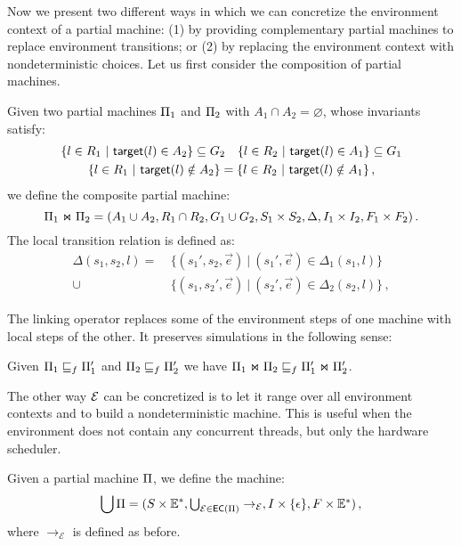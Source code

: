 Now we present two different ways in which
we can concretize the environment context of a partial machine:
(1) by providing complementary partial machines to replace environment transitions;
or (2) by replacing the environment context with nondeterministic choices.
Let us first consider the composition of partial machines.

\begin{definition}
\label{def:link:partial}
Given two partial machines $\Pi_1$ and $\Pi_2$ with
$A_1 \cap A_2 = \varnothing$,
whose invariants satisfy:
\begin{gather*}
\{ l \in R_1 \ |\ \kw{target}(l) \in A_2 \} \subseteq G_2 \quad
\{ l \in R_2 \ |\ \kw{target}(l) \in A_1 \} \subseteq G_1 \\
\{ l \in R_1 \ |\ \kw{target}(l) \notin A_2 \} = \{ l \in R_2 \ |\ \kw{target}(l) \notin A_1 \}\,,
\end{gather*}
we define the composite partial machine:
\[ \Pi_1 \Join \Pi_2 =
	(A_1 \cup A_2,
	 R_1 \cap R_2,
	 G_1 \cup G_2,
	 S_1 \times S_2,
	 \Delta,
	 I_1 \times I_2,
	 F_1 \times F_2) \,. \]
The local transition relation is defined as:
\begin{align*}
\Delta(s_1, s_2, l) =
	&\ \{ (s_1', s_2, \vec{e}) \ |\ (s_1', \vec{e}) \in \Delta_1(s_1, l) \} \\ \cup
	&\ \{ (s_1, s_2', \vec{e}) \ |\ (s_2', \vec{e}) \in \Delta_2(s_2, l) \} \,,
\end{align*}
\end{definition}

The linking operator replaces some of the environment steps of one machine
with local steps of the other.
It preserves simulations in the following sense:

\begin{lemma}
\label{lemma:mono}
Given $\Pi_1 \sqsubseteq_f \Pi_1'$ and $\Pi_2 \sqsubseteq_f \Pi_2'$ we have
$\Pi_1 \Join \Pi_2 \sqsubseteq_f \Pi_1' \Join \Pi_2'$.
\end{lemma}

The other way $\mathcal{E}$ can be concretized
is to let it range over all environment contexts
and to build a nondeterministic machine.
This is useful when the environment
does not contain any concurrent threads,
but only the hardware scheduler.

\begin{definition}
Given a partial machine $\Pi$,
we define the machine:
\[ \bigcup \Pi =
	(S \times \mathbb{E}^*, \textstyle\bigcup\nolimits_{\mathcal{E} \in {{\mathsf{EC}}({\Pi})}} \rightarrow_\mathcal{E},
		I \times \{ \epsilon \}, F \times \mathbb{E}^*) \,, \]
where $\rightarrow_\mathcal{E}$ is defined as before.
\end{definition}

